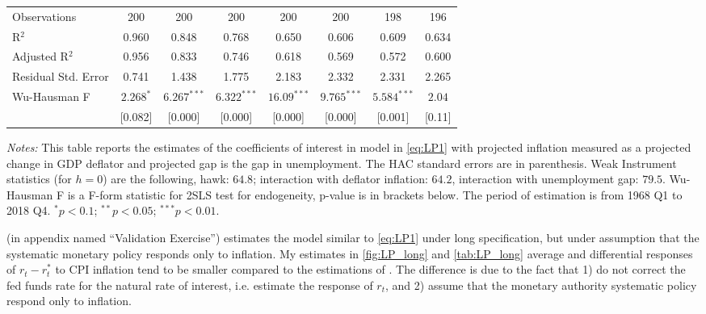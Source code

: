 \documentclass[11pt]{article}
\begin{document}
\begin{table}[!htbp]
\begin{threeparttable}
\begin{tabular}{@{\extracolsep{5pt}}lccccccc}
      Observations & 200 & 200 & 200 & 200 & 200 & 198 & 196 \\ 
      R$^{2}$ & 0.960 & 0.848 & 0.768 & 0.650 & 0.606 & 0.609 & 0.634 \\ 
      Adjusted R$^{2}$ & 0.956 & 0.833 & 0.746 & 0.618 & 0.569 & 0.572 & 0.600 \\ 
      Residual Std. Error & 0.741 & 1.438 & 1.775 & 2.183 & 2.332 & 2.331 & 2.265 \\ 
      Wu-Hausman F & $2.268^{*}$& $6.267^{***}$ & $6.322^{***}$ & $16.09^{***}$ & $9.765^{***}$ & $5.584^{***}$ & $2.04$\\
       &[0.082]& [0.000] & [0.000]& [0.000] & [0.000] & [0.001]& [0.11]\\
      \hline 
      \hline
    \end{tabular} 
    \begin{tablenotes}[flushleft]\scriptsize
      \item[] \textit{Notes:} 
      This table reports the estimates of the coefficients of interest in model in \vref{eq:LP1} with projected inflation measured as a projected change in GDP deflator and projected gap is the gap in unemployment. The \citet{Andrews1991} HAC standard errors  are in parenthesis. Weak Instrument statistics (for $h=0$) are the following, hawk: $64.8$; interaction with deflator inflation: $64.2$, interaction with unemployment gap: $79.5$. Wu-Hausman F is a F-form statistic for 2SLS test for endogeneity, p-value is in brackets below. The period of estimation is from 1968 Q1 to 2018 Q4.
      $^{*}p<0.1$; $^{**}p<0.05$; $^{***}p<0.01$.
    \end{tablenotes}
  \end{threeparttable}
  \end{table} 
  

  
  \citet{HIM2023} (in appendix named ``Validation Exercise'') estimates the model similar to \vref{eq:LP1} under long specification, but under assumption that the systematic monetary policy responds only to inflation. My estimates in \vref{fig:LP_long} and \vref{tab:LP_long} average and differential responses of $r_t-r_t^*$ to CPI inflation tend to be smaller compared to the estimations of \citet{HIM2023}. 
  The difference is due to the fact that \citet{HIM2023} 1) do not correct the fed funds rate for the natural rate of interest, i.e. estimate the response of $r_t$, and 2) assume that the monetary authority systematic policy respond only to inflation. 
\end{document}
